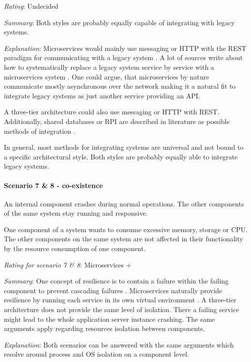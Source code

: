 \textit{Rating}: Undecided

\textit{Summary}:
Both styles are probably equally capable of integrating with legacy systems.

\textit{Explanation}:
Microservices would mainly use messaging or \ac{HTTP} with the \ac{REST} paradigm for communicating with a legacy system \cite{FowlerSmartEndpoints2014}.
A lot of sources write about how to systematically replace a legacy system service by service with a microservices system \citep[p. 127]{Wolff2016}.
One could argue, that microservices by nature communicate mostly asynchronous over the network making it a natural fit to integrate legacy systems as just another service providing an \ac{API}.

A three-tier architecture could also use messaging or \ac{HTTP} with \ac{REST}.
Additionally, shared databases or \ac{RPI} are described in literature as possible methods of integration \citep[p. xxx]{Messaging2004}.

In general, most methods for integrating systems are universal and not bound to a specific architectural style.
Both styles are probably equally able to integrate legacy systems.

\paragraph{Scenario 7 \& 8 - co-existence}
An internal component crashes during normal operations. The other components of the same system stay running and responsive.
\label{quaMicro:s7}
\label{quaMicro:s8}

One component of a system wants to consume excessive memory, storage or CPU. The other components on the same system are not affected in their functionality by the resource consumption of one component.


\textit{Rating for scenario 7 \& 8}: Microservices +

\textit{Summary}:
One concept of resilience is to contain a failure within the failing component to prevent cascading failures  \citep{Reactive2014}.
Microservices naturally provide resilience by running each service in its own virtual environment \citep[p. 5]{Newman2015}.
A three-tier architecture does not provide the same level of isolation.
There a failing service might lead to the whole application server instance crashing.
The same arguments apply regarding resources isolation between components.

\textit{Explanation}:
Both scenarios can be answered with the same arguments which resolve around process and \ac{OS} isolation on a component level.

